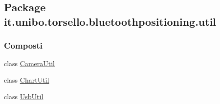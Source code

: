 \hypertarget{namespaceit_1_1unibo_1_1torsello_1_1bluetoothpositioning_1_1util}{}\subsection{Package it.\+unibo.\+torsello.\+bluetoothpositioning.\+util}
\label{namespaceit_1_1unibo_1_1torsello_1_1bluetoothpositioning_1_1util}
\subsubsection*{Composti}
\begin{DoxyCompactItemize}
\item 
class \hyperlink{classit_1_1unibo_1_1torsello_1_1bluetoothpositioning_1_1util_1_1CameraUtil}{Camera\+Util}
\item 
class \hyperlink{classit_1_1unibo_1_1torsello_1_1bluetoothpositioning_1_1util_1_1ChartUtil}{Chart\+Util}
\item 
class \hyperlink{classit_1_1unibo_1_1torsello_1_1bluetoothpositioning_1_1util_1_1UsbUtil}{Usb\+Util}
\end{DoxyCompactItemize}
